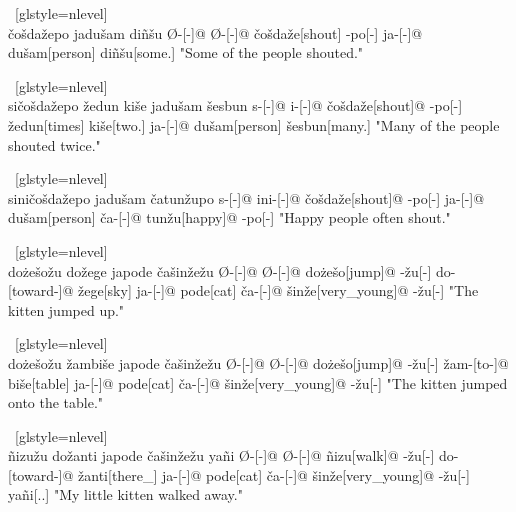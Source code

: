 \ex~[glstyle=nlevel]
\begingl
\glpreamble {} \\ \v{c}o\v{s}da\v{z}epo jadu\v{s}am diñ\v{s}u
\endpreamble
Ø-[{\Ind}-]@
Ø-[{\Pfv}-]@
\v{c}o\v{s}da\v{z}e[shout]
-po[-{\Hg}]
ja-[{\Nom}-]@
du\v{s}am[person]
diñ\v{s}u[some.{\Hg}]
\glft "Some of the people shouted."
\endgl
\xe

\ex~[glstyle=nlevel]
\begingl 
\glpreamble {} \\ si\v{c}o\v{s}da\v{z}epo \v{z}edun ki\v{s}e jadu\v{s}am \v{s}esbun
\endpreamble
s-[{\Ind}-]@
i-[{\Iter}-]@
\v{c}o\v{s}da\v{z}e[shout]@
-po[-{\Hg}]
\v{z}edun[times]
ki\v{s}e[two.{\Inan}]
ja-[{\Nom}-]@
du\v{s}am[person]
\v{s}esbun[many.{\Hg}]
\glft "Many of the people shouted twice."
\endgl
\xe

\ex~[glstyle=nlevel]
\begingl
\glpreamble {} \\ sini\v{c}o\v{s}da\v{z}epo jadu\v{s}am \v{c}atun\v{z}upo
\endpreamble
s-[{\Ind}-]@
ini-[{\Hab}-]@
\v{c}o\v{s}da\v{z}e[shout]@
-po[-{\Hg}]
ja-[{\Nom}-]@
du\v{s}am[person]
\v{c}a-[{\Nom}-]@
tun\v{z}u[happy]@
-po[-{\Hg}]
\glft "Happy people often shout."
\endgl
\xe

\ex~[glstyle=nlevel]
\begingl 
\glpreamble {} \\ do\.{z}e\v{s}o\v{z}u do\v{z}ege japode \v{c}a\v{s}in\v{z}e\v{z}u
\endpreamble
Ø-[{\Ind}-]@
Ø-[{\Pfv}-]@
do\.{z}e\v{s}o[jump]@
-\v{z}u[-{\An}]
do-[toward-]@
\v{z}ege[sky]
ja-[{\Nom}-]@
pode[cat]
\v{c}a-[{\Nom}-]@
\v{s}in\v{z}e[very\_young]@
-\v{z}u[-{\An}]
\glft "The kitten jumped up."
\endgl
\xe

\ex~[glstyle=nlevel]
\begingl 
\glpreamble {} \\ do\.{z}e\v{s}o\v{z}u \v{z}ambi\v{s}e japode \v{c}a\v{s}in\v{z}e\v{z}u
\endpreamble
Ø-[{\Ind}-]@
Ø-[{\Pfv}-]@
do\.{z}e\v{s}o[jump]@
-\v{z}u[-{\An}]
\v{z}am-[to-]@
bi\v{s}e[table]
ja-[{\Nom}-]@
pode[cat]
\v{c}a-[{\Nom}-]@
\v{s}in\v{z}e[very\_young]@
-\v{z}u[-{\An}]
\glft "The kitten jumped onto the table."
\endgl
\xe

\ex~[glstyle=nlevel]
\begingl 
\glpreamble {} \\ ñizu\v{z}u do\v{z}anti japode \v{c}a\v{s}in\v{z}e\v{z}u yañi
\endpreamble
Ø-[{\Ind}-]@
Ø-[{\Pfv}-]@
ñizu[walk]@
-\v{z}u[-{\An}]
do-[toward-]@
\v{z}anti[there\_{\Dist}]
ja-[{\Nom}-]@
pode[cat]
\v{c}a-[{\Nom}-]@
\v{s}in\v{z}e[very\_young]@
-\v{z}u[-{\An}]
yañi[{\Fex}.{\Hg}.{\Gen}]
\glft "My little kitten walked away."
\endgl
\xe

